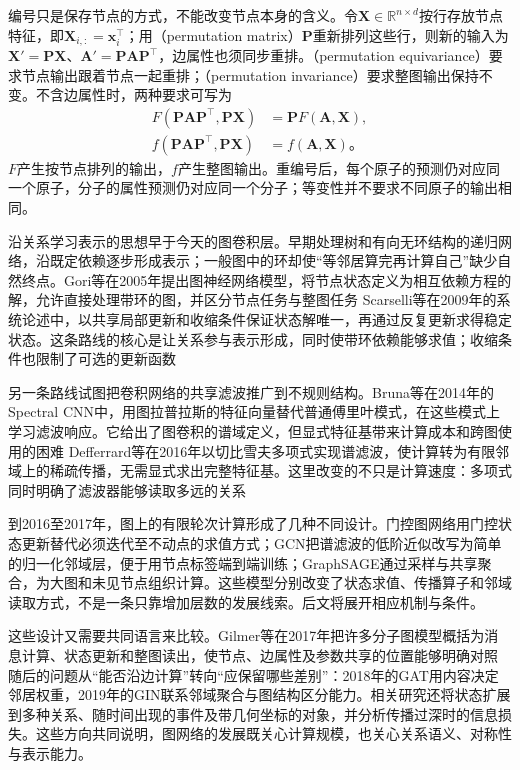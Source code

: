 编号只是保存节点的方式，不能改变节点本身的含义。令$\bm{X}\in\mathbb{R}^{n\times d}$按行存放节点特征，即$\bm{X}_{i,:}=\bm{x}_i^{\top}$；用（permutation matrix）$\bm{P}$重新排列这些行，则新的输入为$\bm{X}'=\bm{P}\bm{X}$、$\bm{A}'=\bm{P}\bm{A}\bm{P}^{\top}$，边属性也须同步重排。（permutation equivariance）要求节点输出跟着节点一起重排；（permutation invariance）要求整图输出保持不变。不含边属性时，两种要求可写为
\begin{equation}
  \begin{aligned}
    F(\bm{P}\bm{A}\bm{P}^{\top},\bm{P}\bm{X})
      &=\bm{P}F(\bm{A},\bm{X}),\\
    f(\bm{P}\bm{A}\bm{P}^{\top},\bm{P}\bm{X})
      &=f(\bm{A},\bm{X})\text{。}
  \end{aligned}
  \label{eq:gnn-permutation}
\end{equation}
$F$产生按节点排列的输出，$f$产生整图输出。重编号后，每个原子的预测仍对应同一个原子，分子的属性预测仍对应同一个分子；等变性并不要求不同原子的输出相同。

沿关系学习表示的思想早于今天的图卷积层。早期处理树和有向无环结构的递归网络，沿既定依赖逐步形成表示；一般图中的环却使“等邻居算完再计算自己”缺少自然终点。Gori等在2005年提出图神经网络模型，将节点状态定义为相互依赖方程的解，允许直接处理带环的图，并区分节点任务与整图任务 Scarselli等在2009年的系统论述中，以共享局部更新和收缩条件保证状态解唯一，再通过反复更新求得稳定状态。这条路线的核心是让关系参与表示形成，同时使带环依赖能够求值；收缩条件也限制了可选的更新函数

另一条路线试图把卷积网络的共享滤波推广到不规则结构。Bruna等在2014年的Spectral CNN中，用图拉普拉斯的特征向量替代普通傅里叶模式，在这些模式上学习滤波响应。它给出了图卷积的谱域定义，但显式特征基带来计算成本和跨图使用的困难 Defferrard等在2016年以切比雪夫多项式实现谱滤波，使计算转为有限邻域上的稀疏传播，无需显式求出完整特征基。这里改变的不只是计算速度：多项式同时明确了滤波器能够读取多远的关系

到2016至2017年，图上的有限轮次计算形成了几种不同设计。门控图网络用门控状态更新替代必须迭代至不动点的求值方式；GCN把谱滤波的低阶近似改写为简单的归一化邻域层，便于用节点标签端到端训练；GraphSAGE通过采样与共享聚合，为大图和未见节点组织计算。这些模型分别改变了状态求值、传播算子和邻域读取方式，不是一条只靠增加层数的发展线索。后文将展开相应机制与条件。

这些设计又需要共同语言来比较。Gilmer等在2017年把许多分子图模型概括为消息计算、状态更新和整图读出，使节点、边属性及参数共享的位置能够明确对照 随后的问题从“能否沿边计算”转向“应保留哪些差别”：2018年的GAT用内容决定邻居权重，2019年的GIN联系邻域聚合与图结构区分能力。相关研究还将状态扩展到多种关系、随时间出现的事件及带几何坐标的对象，并分析传播过深时的信息损失。这些方向共同说明，图网络的发展既关心计算规模，也关心关系语义、对称性与表示能力。

